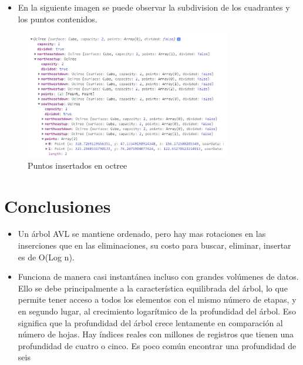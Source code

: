 \documentclass{article}
\begin{document}
\begin{itemize}
\item En la siguiente imagen se puede observar la subdivision de los cuadrantes y los puntos contenidos.
\end{itemize}

\begin{figure}[htbp]
\centering
\includegraphics[width=0.8\textwidth]{img/octree_insert_data.png}
\caption{Puntos insertados en octree}
\label{fig:octree_insert_data}
\end{figure}
  

\section{Conclusiones}
        \begin{itemize}
                 \item Un árbol AVL se mantiene ordenado, pero hay mas rotaciones en las inserciones que en las eliminaciones, su costo para buscar, eliminar, insertar  es de O(Log n).
                 \item Funciona de manera casi instantánea incluso con grandes volúmenes de datos. Ello se debe principalmente a la característica equilibrada del árbol, lo que permite tener acceso a todos los elementos con el mismo número de etapas, y en segundo lugar, al crecimiento logarítmico de la profundidad del árbol. Eso significa que la profundidad del árbol crece lentamente en comparación al número de hojas. Hay índices reales con millones de registros que tienen una profundidad de cuatro o cinco. Es poco común encontrar una profundidad de seis
        \end{itemize}
\end{document}
